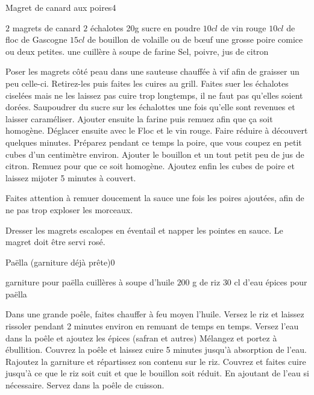 \begin{recette}{Magret de canard aux poires}{4}{}{}
\begin{ingredients}
\ingredient $2$ magrets de canard
\ingredient $2$ échalotes
\ingredient 20g sucre en poudre
\ingredient  $10 \unit{cl}$ de vin rouge
\ingredient  $10 \unit{cl}$ de floc de Gascogne
\ingredient  $15 \unit{cl}$ de bouillon de volaille ou de bœuf
\ingredient  une grosse poire comice ou deux petites.
\ingredient une cuillère à soupe de farine
\ingredient  Sel, poivre, jus de citron

\end{ingredients}

\begin{preparation}
\etape Poser les magrets côté peau dans une sauteuse chauffée à vif afin de graisser un peu celle-ci. Retirez-les puis faites les cuires au grill.
\etape Faites suer les échalotes ciselées mais ne les laissez pas cuire trop longtemps, il ne faut pas qu'elles soient dorées. 
\etape Saupoudrer du sucre sur les échalottes une fois qu'elle sont revenues et laisser caraméliser. 
\etape Ajouter ensuite la farine puis remuez afin que ça soit homogène.
\etape Déglacer ensuite avec le Floc et le vin rouge. 
\etape Faire réduire à découvert quelques minutes. Préparez pendant ce temps la poire, que vous coupez en petit cubes d'un centimètre environ.
\etape Ajouter le bouillon et un tout petit peu de jus de citron. Remuez pour que ce soit homogène. Ajoutez enfin les cubes de poire et laissez mijoter 5 minutes à couvert.
\begin{remarque}
Faites attention à remuer doucement la sauce une fois les poires ajoutées, afin de ne pas trop exploser les morceaux.
\end{remarque}
\etape Dresser les magrets escalopes en éventail et napper les pointes en sauce.
\etape Le magret doit être servi rosé.
\end{preparation}

\end{recette}

\begin{recette}{Paëlla (garniture déjà prête)}{0}{}{}
\begin{ingredients}
\ingredient garniture pour paëlla
 cuillères à soupe d'huile
\ingredient $200$ g de riz
\ingredient $30$ cl d'eau
\ingredient épices pour paëlla
\end{ingredients}

\begin{preparation}
\etape Dans une grande poêle, faites chauffer à feu moyen l'huile.
\etape Versez le riz et laissez rissoler pendant 2 minutes environ en remuant de temps en temps.
\etape Versez l'eau dans la poêle et ajoutez les épices (safran et autres)
\etape Mélangez et portez à ébullition. Couvrez la poêle et laissez cuire 5 minutes jusqu'à absorption de l'eau.
\etape Rajoutez la garniture et répartissez son contenu sur le riz. Couvrez et faites cuire jusqu'à ce que le riz soit cuit et que le bouillon soit réduit. En ajoutant de l'eau si nécessaire.
\etape Servez dans la poêle de cuisson.
\end{preparation}

\end{recette}

